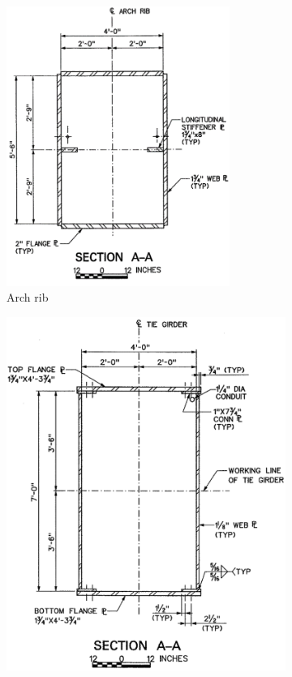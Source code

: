 \begin{figure}[H]
\centering
\begin{subfigure}{0.33\textwidth}
    \centering
    \vspace*{0.68cm}
    \includegraphics[width=0.8\textwidth]{overleaf/Appendix/Pictures/arch_3.PNG}
    \vspace*{0.68cm}
    \caption{Arch rib}
    \label{fig:cs_arch}
\end{subfigure}%
\begin{subfigure}{.33\textwidth}
    \centering
    \includegraphics[width=\textwidth]{overleaf/Appendix/Pictures/tie_3.PNG}

\end{subfigure}
\end{figure}
